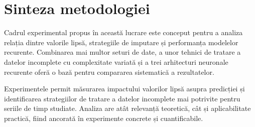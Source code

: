 \section{Sinteza metodologiei}

Cadrul experimental propus în această lucrare este conceput pentru a analiza relația dintre valorile lipsă, strategiile de imputare și performanța modelelor recurente. Combinarea mai multor seturi de date, a unor tehnici de tratare a datelor incomplete cu complexitate variată și a trei arhitecturi neuronale recurente oferă o bază pentru compararea sistematică a rezultatelor.

Experimentele permit măsurarea impactului valorilor lipsă asupra predicției și identificarea strategiilor de tratare a datelor incomplete mai potrivite pentru seriile de timp studiate. Analiza are atât relevanță teoretică, cât și aplicabilitate practică, fiind ancorată în experimente concrete și cuantificabile.
